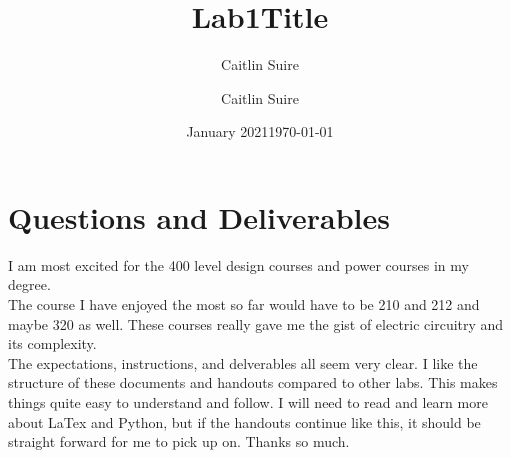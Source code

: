 \documentclass{article}
\title{Lab1}
\author{Caitlin Suire}
\date{January 2021}
\title{Title}
\author{Caitlin Suire}
\date{\today}
\begin{document}
\maketitle

\section{Questions and Deliverables}

I am most excited for the 400 level design courses and power courses in my degree.\\ %
The course I have enjoyed the most so far would have to be 210 and 212 and maybe 320 as well. These courses really gave me the gist of electric circuitry and its complexity. 
\\ %

\noindent The expectations, instructions, and delverables all seem very clear. I like the structure of these documents and handouts compared to other labs. This makes things quite easy to understand and follow. I will need to read and learn more about LaTex and Python, but if the handouts continue like this, it should be straight forward for me to pick up on. Thanks so much. 
\end{document}
